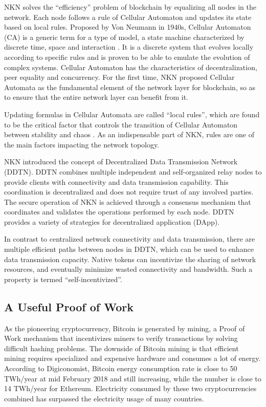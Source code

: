 \documentclass[reprint,pre,aps]{revtex4-1}
\begin{document}
NKN solves the ``efficiency'' problem of blockchain by equalizing all nodes in the network. Each node follows a rule of Cellular Automaton and updates its state based on local rules. Proposed by Von Neumann in 1940s, Cellular Automaton (CA) is a generic term for a type of model, a state machine characterized by discrete time, space and interaction \cite{von1951general, von1966theory}. It is a discrete system that evolves locally according to specific rules and is proven to be able to emulate the evolution of complex systems. Cellular Automaton has the characteristics of decentralization, peer equality and concurrency. For the first time, NKN proposed Cellular Automata as the fundamental element of the network layer for blockchain, so as to ensure that the entire network layer can benefit from it.

Updating formulas in Cellular Automata are called ``local rules'', which are found to be the critical factor that controls the transition of Cellular Automaton between stability and chaos \cite{wolfram2002new}. As an indispensable part of NKN, rules are one of the main factors impacting the network topology.

NKN introduced the concept of Decentralized Data Transmission Network (DDTN). DDTN combines multiple independent and self-organized relay nodes to provide clients with connectivity and data transmission capability. This coordination is decentralized and does not require trust of any involved parties. The secure operation of NKN is achieved through a consensus mechanism that coordinates and validates the operations performed by each node. DDTN provides a variety of strategies for decentralized application (DApp).

In contrast to centralized network connectivity and data transmission, there are multiple efficient paths between nodes in DDTN, which can be used to enhance data transmission capacity. Native tokens can incentivize the sharing of network resources, and eventually minimize wasted connectivity and bandwidth. Such a property is termed ``self-incentivized''.

\subsection{A Useful Proof of Work}

As the pioneering cryptocurrency, Bitcoin \cite{nakamoto2008bitcoin} is generated by mining, a Proof of Work mechanism that incentivizes miners to verify transactions by solving difficult hashing problems. The downside of Bitcoin mining is that efficient mining requires specialized and expensive hardware and consumes a lot of energy. According to Digiconomist, Bitcoin energy consumption rate is close to 50 TWh/year at mid February 2018 and still increasing, while the number is close to 14 TWh/year for Ethereum. Electricity consumed by these two cryptocurrencies combined has surpassed the electricity usage of many countries.
\end{document}
